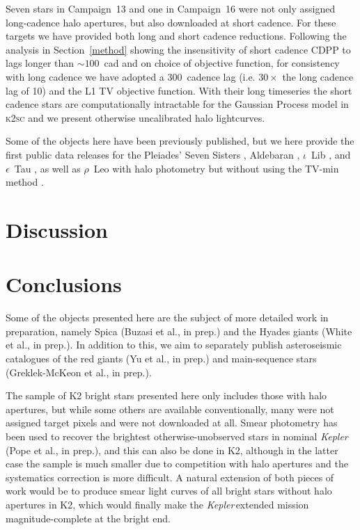 \documentclass[modern]{aastex62}
\newcommand\kepler{\emph{Kepler}\,}
\begin{document}
Seven stars in Campaign~13 and one in Campaign~16 were not only assigned long-cadence halo apertures, but also downloaded at short cadence. For these targets we have provided both long and short cadence reductions. Following the analysis in Section~\ref{method} showing the insensitivity of short cadence CDPP to lags longer than $\sim 100$~cad and on choice of objective function, for consistency with  long cadence we have adopted a 300~cadence lag (i.e. $30 \times$ the long cadence lag of 10) and the L1 TV objective function. With their long timeseries the short cadence stars are computationally intractable for the Gaussian Process model in \textsc{k2sc} and we present otherwise uncalibrated halo lightcurves.



Some of the objects here have been previously published, but we here provide the first public data releases for the Pleiades' Seven Sisters \citep{White2017}, Aldebaran \citep{Farr2018}, $\iota$~Lib \citep{Buysschaert2018}, and $\epsilon$~Tau \citep{Arentoft2019}, as well as $\rho$~Leo with halo photometry but without using the TV-min method \citep{Aerts2018}.

\section{Discussion}
\label{sec:discussion}





\section{Conclusions}
\label{sec:conclusions}


Some of the objects presented here are the subject of more detailed work in preparation, namely Spica (Buzasi et al., in prep.) and the Hyades giants (White et al., in prep.). In addition to this, we aim to separately publish asteroseismic catalogues of the red giants (Yu et al., in prep.) and main-sequence stars (Greklek-McKeon et al., in prep.). 

The sample of K2 bright stars presented here only includes those with halo apertures, but while some others are available conventionally, many were not assigned target pixels and were not downloaded at all. Smear photometry has been used to recover the brightest otherwise-unobserved stars in nominal \kepler (Pope et al., in prep.), and this can also be done in K2, although in the latter case the sample is much smaller due to competition with halo apertures and the systematics correction is more difficult. A natural extension of both pieces of work would be to produce smear light curves of all bright stars without halo apertures in K2, which would finally make the \kepler extended mission magnitude-complete at the bright end. 
\end{document}
